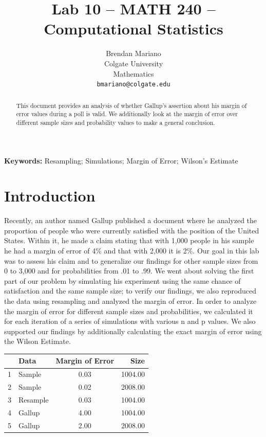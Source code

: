 \documentclass{article}\usepackage[]{graphicx}\usepackage[]{xcolor}
\newenvironment{Figure}
  {\par\medskip\noindent\minipage{\linewidth}}
  {\endminipage\par\medskip}
\begin{document}
\vspace{-1in}
\title{Lab 10 -- MATH 240 -- Computational Statistics}

\author{
  Brendan Mariano \\
  Colgate University  \\
  Mathematics  \\
  {\tt bmariano@colgate.edu}
}

\date{}

\maketitle

\begin{multicols}{2}

\begin{abstract}
This document provides an analysis of whether Gallup's assertion about his margin of error values during a poll is valid. We additionally look at the margin of error over different sample sizes and probability values to make a general conclusion.
\end{abstract}

\noindent \textbf{Keywords:} Resampling; Simulations; Margin of Error; Wilson's Estimate

\section{Introduction}
Recently, an author named Gallup published a document where he analyzed the proportion of people who were currently satisfied with the position of the United States. Within it, he made a claim stating that with 1,000 people in his sample he had a margin of error of 4\% and that with 2,000 it is 2\%. Our goal in this lab was to assess his claim and to generalize our findings for other sample sizes from 0 to 3,000 and for probabilities from .01 to .99. We went about solving the first part of our problem by simulating his experiment using the same chance of satisfaction and the same sample size; to verify our findings, we also reproduced the data using resampling and analyzed the margin of error. In order to analyze the margin of error for different sample sizes and probabilities, we calculated it for each iteration of a series of simulations with various n and p values. We also supported our findings by additionally calculating the exact margin of error using the Wilson Estimate. 

\begin{Figure}
\centering
\begin{tabular}{rlcr}
  \hline
 & Data & Margin of Error & Size \\ 
  \hline
1 & Sample & 0.03 & 1004.00 \\ 
2 & Sample & 0.02 & 2008.00 \\ 
3 & Resample & 0.03 & 1004.00 \\ 
4 & Gallup & 4.00 & 1004.00 \\ 
5 & Gallup & 2.00 & 2008.00 \\ 
  \hline
\end{tabular}
\end{Figure}




\end{multicols}
\end{document}
